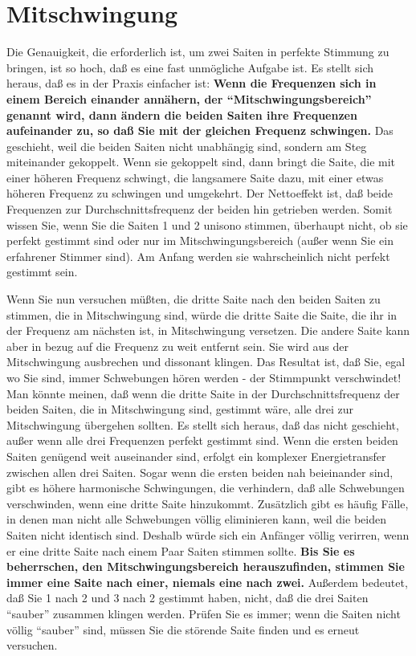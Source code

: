 
\hypertarget{c2_5e}{}
\section{Mitschwingung}
\label{c2_5_mits} 

Die Genauigkeit, die erforderlich ist, um zwei Saiten in perfekte Stimmung zu bringen, ist so hoch, daß es eine fast unmögliche Aufgabe ist.
Es stellt sich heraus, daß es in der Praxis einfacher ist: \textbf{Wenn die Frequenzen sich in einem Bereich einander annähern, der \enquote{Mitschwingungsbereich} genannt wird, dann ändern die beiden Saiten ihre Frequenzen aufeinander zu, so daß Sie mit der gleichen Frequenz schwingen.}
Das geschieht, weil die beiden Saiten nicht unabhängig sind, sondern am Steg miteinander gekoppelt.
Wenn sie gekoppelt sind, dann bringt die Saite, die mit einer höheren Frequenz schwingt, die langsamere Saite dazu, mit einer etwas höheren Frequenz zu schwingen und umgekehrt.
Der Nettoeffekt ist, daß beide Frequenzen zur Durchschnittsfrequenz der beiden hin getrieben werden.
Somit wissen Sie, wenn Sie die Saiten 1 und 2 unisono stimmen, überhaupt nicht, ob sie perfekt gestimmt sind oder nur im Mitschwingungsbereich (außer wenn Sie ein erfahrener Stimmer sind).
Am Anfang werden sie wahrscheinlich nicht perfekt gestimmt sein.

Wenn Sie nun versuchen müßten, die dritte Saite nach den beiden Saiten zu stimmen, die in Mitschwingung sind, würde die dritte Saite die Saite, die ihr in der Frequenz am nächsten ist, in Mitschwingung versetzen.
Die andere Saite kann aber in bezug auf die Frequenz zu weit entfernt sein.
Sie wird aus der Mitschwingung ausbrechen und dissonant klingen.
Das Resultat ist, daß Sie, egal wo Sie sind, immer Schwebungen hören werden - der Stimmpunkt verschwindet!
Man könnte meinen, daß wenn die dritte Saite in der Durchschnittsfrequenz der beiden Saiten, die in Mitschwingung sind, gestimmt wäre, alle drei zur Mitschwingung übergehen sollten.
Es stellt sich heraus, daß das nicht geschieht, außer wenn alle drei Frequenzen perfekt gestimmt sind.
Wenn die ersten beiden Saiten genügend weit auseinander sind, erfolgt ein komplexer Energietransfer zwischen allen drei Saiten.
Sogar wenn die ersten beiden nah beieinander sind, gibt es höhere harmonische Schwingungen, die verhindern, daß alle Schwebungen verschwinden, wenn eine dritte Saite hinzukommt.
Zusätzlich gibt es häufig Fälle, in denen man nicht alle Schwebungen völlig eliminieren kann, weil die beiden Saiten nicht identisch sind.
Deshalb würde sich ein Anfänger völlig verirren, wenn er eine dritte Saite nach einem Paar Saiten stimmen sollte.
\textbf{Bis Sie es beherrschen, den Mitschwingungsbereich herauszufinden, stimmen Sie immer eine Saite nach einer, niemals eine nach zwei.}
Außerdem bedeutet, daß Sie 1 nach 2 und 3 nach 2 gestimmt haben, nicht, daß die drei Saiten \enquote{sauber} zusammen klingen werden.
Prüfen Sie es immer; wenn die Saiten nicht völlig \enquote{sauber} sind, müssen Sie die störende Saite finden und es erneut versuchen.

